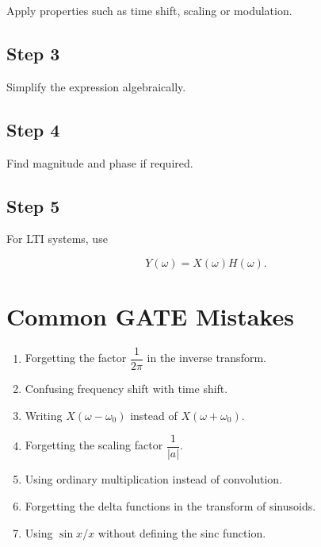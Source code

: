 Apply properties such as time shift, scaling or modulation.


\subsection{Step 3}

Simplify the expression algebraically.


\subsection{Step 4}

Find magnitude and phase if required.


\subsection{Step 5}

For LTI systems, use

\[
Y(\omega)=X(\omega)H(\omega).
\]


\section{Common GATE Mistakes}

\begin{enumerate}
\item Forgetting the factor \(\dfrac{1}{2\pi}\) in the inverse transform.
\item Confusing frequency shift with time shift.
\item Writing \(X(\omega-\omega_0)\) instead of \(X(\omega+\omega_0)\).
\item Forgetting the scaling factor \(\dfrac{1}{|a|}\).
\item Using ordinary multiplication instead of convolution.
\item Forgetting the delta functions in the transform of sinusoids.
\item Using \(\sin x/x\) without defining the sinc function.
\end{enumerate}

